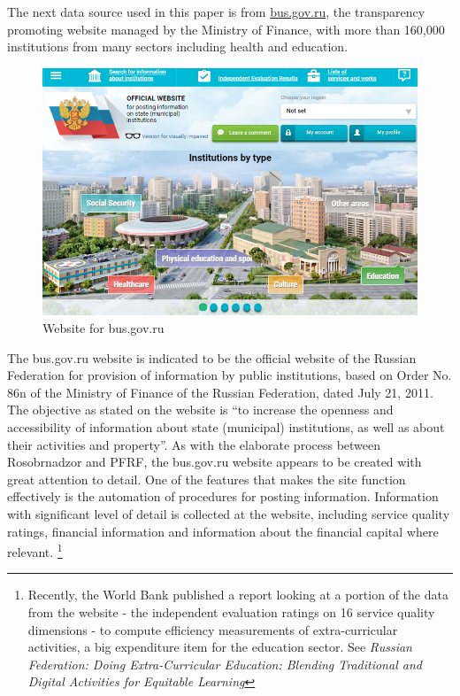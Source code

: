 \documentclass[alpha-refs]{wiley-article-05g}
\begin{document}
The next data source used in this paper is from \url{bus.gov.ru}, the transparency promoting website managed by the Ministry of Finance, with more than 160,000 institutions from many sectors including health and education. 

\vspace{-0.25in}

\begin{center}
	\begin{figure}[htbp!]
\begin{minipage}[b]{1\linewidth}
			\centering
			\hspace*{-0.1in}
         \includegraphics[scale=0.4, width=5.6in, frame]{busg_cap1c.png}
		\end{minipage}
			\caption{Website for bus.gov.ru}\label{fig:1.2}
	\end{figure}
\end{center}

\vspace{-0.2in}

The bus.gov.ru website is indicated to be the official website of the Russian Federation for provision of information by public institutions, based on Order No. 86n of the Ministry of Finance of the Russian Federation, dated July 21, 2011. The objective as stated on the website is ``to increase the openness and accessibility of information about state (municipal) institutions, as well as about their activities and property''. As with the elaborate process between Rosobrnadzor and PFRF, the bus.gov.ru website appears to be created with great attention to detail. One of the features that makes the site function effectively is the automation of procedures for posting information. Information with significant level of detail is collected at the website, including service quality ratings, financial information and information about the financial capital where relevant. \footnote{Recently, the World Bank published a report looking at a portion of the data from the website - the independent evaluation ratings on 16 service quality dimensions - to compute efficiency measurements of extra-curricular activities, a big expenditure item for the education sector. See \textit{Russian Federation: Doing Extra-Curricular Education: Blending Traditional and Digital Activities for Equitable Learning}}
\end{document}
